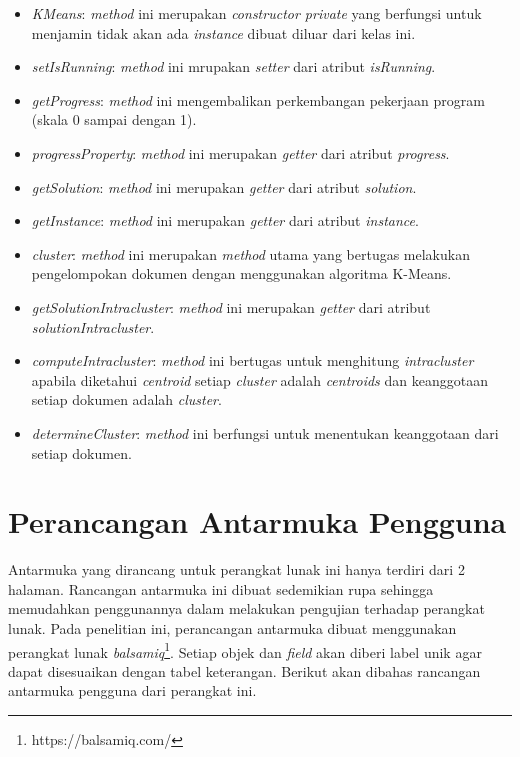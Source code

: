 \begin{itemize}
	\item \textit{KMeans}: \textit{method} ini merupakan \textit{constructor private} yang berfungsi untuk menjamin tidak akan ada \textit{instance} dibuat diluar dari kelas ini.
	\item \textit{setIsRunning}: \textit{method} ini mrupakan \textit{setter} dari atribut \textit{isRunning}.
	\item \textit{getProgress}: \textit{method} ini mengembalikan perkembangan pekerjaan program (skala 0 sampai dengan 1).
	\item \textit{progressProperty}: \textit{method} ini merupakan \textit{getter} dari atribut \textit{progress}.
	\item \textit{getSolution}: \textit{method} ini merupakan \textit{getter} dari atribut \textit{solution}.
	\item \textit{getInstance}: \textit{method} ini merupakan \textit{getter} dari atribut \textit{instance}.
	\item \textit{cluster}: \textit{method} ini merupakan \textit{method} utama yang bertugas melakukan pengelompokan dokumen dengan menggunakan algoritma K-Means.
	\item \textit{getSolutionIntracluster}: \textit{method} ini merupakan \textit{getter} dari atribut \textit{solutionIntracluster}.
	\item \textit{computeIntracluster}: \textit{method} ini bertugas untuk menghitung \textit{intracluster} apabila diketahui \textit{centroid} setiap \textit{cluster} adalah \textit{centroids} dan keanggotaan setiap dokumen adalah \textit{cluster}.
	\item \textit{determineCluster}: \textit{method} ini berfungsi untuk menentukan keanggotaan dari setiap dokumen.
\end{itemize}

\section{Perancangan Antarmuka Pengguna}
Antarmuka yang dirancang untuk perangkat lunak ini hanya terdiri dari 2 halaman. Rancangan antarmuka ini dibuat sedemikian rupa sehingga memudahkan penggunannya dalam melakukan pengujian terhadap perangkat lunak. Pada penelitian ini, perancangan antarmuka dibuat menggunakan perangkat lunak \textit{balsamiq}\footnote{https://balsamiq.com/}. Setiap objek dan \textit{field} akan diberi label unik agar dapat disesuaikan dengan tabel keterangan. Berikut akan dibahas rancangan antarmuka pengguna dari perangkat ini.

